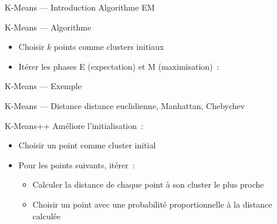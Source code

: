 \begin{frame}{K-Means --- Introduction}
  Algorithme EM
\end{frame}

\begin{frame}{K-Means --- Algorithme}
  \begin{itemize}[<+->]
    \item Choisir $k$ points comme clusters initiaux
    \item Itérer les phases E (expectation) et M (maximisation)~:
  \end{itemize}  
\end{frame}

\begin{frame}{K-Means --- Exemple}
\end{frame}

\begin{frame}{K-Means --- Distance}
  distance euclidienne, Manhattan, Chebychev
\end{frame}

\begin{frame}{K-Means++}
  Améliore l'initialisation~:

  \begin{itemize}[<+->]
    \item Choisir un point comme cluster initial
    \item Pour les points suivants, itérer~:
      \begin{itemize}[<+->]
        \item Calculer la distance de chaque point à son cluster le plus proche
        \item Choisir un point avec une probabilité proportionnelle à la distance calculée
      \end{itemize}
  \end{itemize}

\end{frame}

